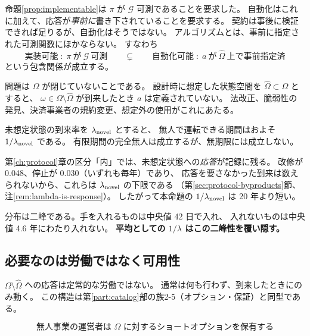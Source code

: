 命題\ref{prop:implementable}は $\pi$ が $\mathcal{G}$ 可測であることを要求した。
自動化はこれに加えて、応答が\emph{事前に}書き下されていることを要求する。
契約は事後に検証できれば足りるが、自動化はそうではない。
アルゴリズムとは、事前に指定された可測関数にほかならない。
すなわち
\begin{equation}
\text{実装可能}\;:\;\pi\ \text{が}\ \mathcal{G}\ \text{可測}
\qquad\subsetneq\qquad
\text{自動化可能}\;:\;a\ \text{が}\ \hat\Omega\ \text{上で事前指定済}
\end{equation}
という包含関係が成立する。

問題は $\Omega$ が閉じていないことである。
設計時に想定した状態空間を $\hat\Omega\subset\Omega$ とすると、
$\omega\in\Omega\setminus\hat\Omega$ が到来したとき $a$ は定義されていない。
法改正、脆弱性の発見、決済事業者の規約変更、想定外の使用がこれにあたる。

\begin{proposition}[無人化は期間の関数である]
\label{prop:unmanned-period}
未想定状態の到来率を $\lambda_{\rm novel}$ とすると、
無人で運転できる期間はおよそ $1/\lambda_{\rm novel}$ である。
有限期間の完全無人は成立するが、無期限には成立しない。
\end{proposition}

\begin{remark}
\label{rem:lambda-upper}
第\ref{ch:protocol}章の区分「内」では、未想定状態への\emph{応答}が記録に残る。
改修が 0.048、停止が 0.030（いずれも毎年）であり、
応答を要さなかった到来は数えられないから、これらは $\lambda_{\rm novel}$ の下限である
（第\ref{sec:protocol-byproducts}節、注\ref{rem:lambda-is-response}）。
したがって本命題の $1/\lambda_{\rm novel}$ は 20 年より短い。

分布は二峰である。手を入れるものは中央値 42 日で入れ、
入れないものは中央値 4.6 年にわたり入れない。
\textbf{平均としての $1/\lambda$ はこの二峰性を覆い隠す。}
\end{remark}

\subsection{必要なのは労働ではなく可用性}

$\Omega\setminus\hat\Omega$ への応答は定常的な労働ではない。
通常は何も行わず、到来したときにのみ動く。
この構造は第\ref{part:catalog}部の族2-5（オプション・保証）と同型である。

\begin{equation}
\text{無人事業の運営者は }\Omega\text{ に対するショートオプションを保有する}
\end{equation}

